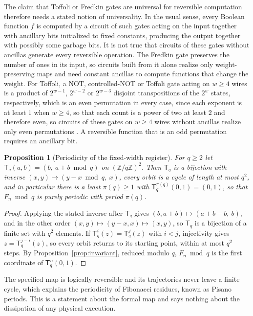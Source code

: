 \documentclass[11pt]{article}
\newtheorem{proposition}{Proposition}
\theoremstyle{definition}
\theoremstyle{remark}
\newcommand{\Tm}{\mathsf{T}}
\begin{document}
The claim that Toffoli or Fredkin gates are universal for reversible computation therefore needs a stated notion of universality. In the usual sense, every Boolean function $f$ is computed by a circuit of such gates acting on the input together with ancillary bits initialized to fixed constants, producing the output together with possibly some garbage bits. It is not true that circuits of these gates without ancillas generate every reversible operation. The Fredkin gate preserves the number of ones in its input, so circuits built from it alone realize only weight-preserving maps and need constant ancillas to compute functions that change the weight. For Toffoli, a NOT, controlled-NOT or Toffoli gate acting on $w \ge 4$ wires is a product of $2^{w-1}$, $2^{w-2}$ or $2^{w-3}$ disjoint transpositions of the $2^{w}$ states, respectively, which is an even permutation in every case, since each exponent is at least $1$ when $w \ge 4$, so that each count is a power of two at least $2$ and therefore even, so circuits of these gates on $w \ge 4$ wires without ancillas realize only even permutations \cite{toffoli1980,shende2003}. A reversible function that is an odd permutation requires an ancillary bit.

\begin{proposition}[Periodicity of the fixed-width register]\label{prop:period}
For $q \ge 2$ let $\Tm_q(a,b) = (b,\ a + b \bmod q)$ on $(\mathbb{Z}/q\mathbb{Z})^{2}$. Then $\Tm_q$ is a bijection with inverse $(x,y) \mapsto (y - x \bmod q,\ x)$, every orbit is a cycle of length at most $q^{2}$, and in particular there is a least $\pi(q) \ge 1$ with $\Tm_q^{\pi(q)}(0,1) = (0,1)$, so that $F_n \bmod q$ is purely periodic with period $\pi(q)$.
\end{proposition}

\begin{proof}
Applying the stated inverse after $\Tm_q$ gives $(b, a + b) \mapsto (a + b - b,\ b)$, and in the other order $(x, y) \mapsto (y - x, x) \mapsto (x, y)$, so $\Tm_q$ is a bijection of a finite set with $q^2$ elements. If $\Tm_q^{i}(z) = \Tm_q^{j}(z)$ with $i < j$, injectivity gives $z = \Tm_q^{j - i}(z)$, so every orbit returns to its starting point, within at most $q^2$ steps. By Proposition~\ref{prop:invariant}, reduced modulo $q$, $F_n \bmod q$ is the first coordinate of $\Tm_q^{n}(0,1)$.
\end{proof}

The specified map is logically reversible and its trajectories never leave a finite cycle, which explains the periodicity of Fibonacci residues, known as Pisano periods. This is a statement about the formal map and says nothing about the dissipation of any physical execution.
\end{document}
